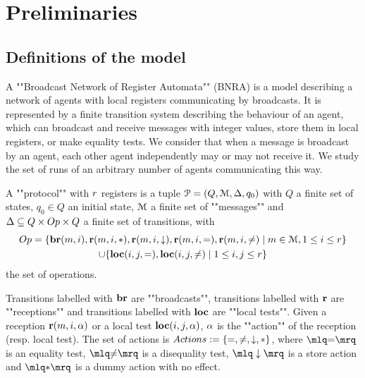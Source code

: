 \section{Preliminaries}

\subsection{Definitions of the model}
A ""Broadcast Network of Register Automata"" (BNRA) \cite{DST2013} is a model describing a network of agents with local registers communicating by broadcasts. It is represented by a finite transition system describing the behaviour of an agent, which can broadcast and receive messages with integer values, store them in local registers, or make equality tests. 
We consider that when a message is broadcast by an agent, each other agent independently may or may not receive it. 
We study the set of runs of an arbitrary number of agents communicating this way.

\begin{definition}[Protocols]
	A ""protocol"" with $r$ registers is a tuple $\mathcal{P} = (Q, \mathcal{M}, \Delta, q_0)$  with $Q$ a finite set of states, $q_0 \in Q$ an initial state, $\mathcal{M}$ a finite set of ""messages""  and $\transitions \subseteq Q \times \operations \times Q$ a finite set of transitions, with 
	\begin{multline*}
	\operations = \set{\br{\amessage}{i}, \rec{\amessage}{i}{\dummyact}, \rec{\amessage}{i}{\enregact}, \rec{\amessage}{i}{\eqtestact}, \rec{\amessage}{i}{\diseqtestact} \mid \amessage \in \messages, 1 \leq i \leq \regnum} \\ \cup  
	\set{\loc{i}{j}{\eqtestact}, \loc{i}{j}{\diseqtestact} \mid 1 \leq i,j \leq \regnum}
	\end{multline*}
	the set of operations.
	
	Transitions labelled with $\textbf{br}$ are ""broadcasts"", transitions labelled with $\textbf{r}$ are ""receptions"" and transitions labelled with $\textbf{loc}$ are ""local tests"".
	Given a reception $\textbf{r}(m, i, \alpha)$ or a local test $\textbf{loc}(i,j,\alpha)$, $\alpha$ is the ""action"" of the reception (resp. local test). 
The set of actions is $\actions := \set{\eqtestact, \diseqtestact, \enregact, \dummyact}$, where 
$\quotemarks{\eqtestact}$ is an equality test, $\quotemarks{\diseqtestact}$ is a disequality test, $\quotemarks{\enregact}$ is a store action and $\quotemarks{\dummyact}$ is a dummy action with no effect.
\end{definition}

